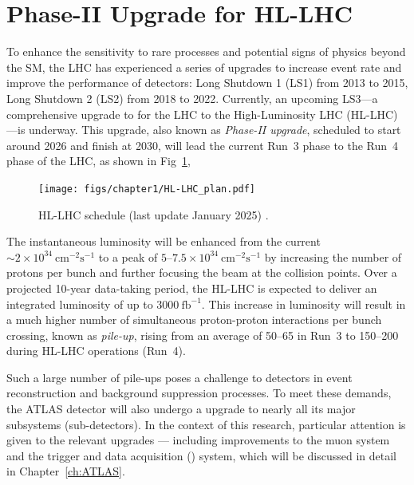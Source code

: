 \section{Phase-II Upgrade for HL-LHC} \label{sec:upgrade}
To enhance the sensitivity to rare processes and potential signs of physics beyond the SM, the LHC has experienced a series of upgrades to increase event rate and improve the performance of detectors: Long Shutdown 1 (LS1) from 2013 to 2015, Long Shutdown 2 (LS2) from 2018 to 2022. Currently, an upcoming LS3---a comprehensive upgrade to for the LHC to the High-Luminosity LHC (HL-LHC)---is underway. This upgrade, also known as \textit{Phase-II upgrade}, scheduled to start around 2026 and finish at 2030, will lead the current Run~3 phase to the Run~4 phase of the LHC, as shown in Fig~\ref{fig:HL-LHC},

\begin{figure}[htbp]
  \centering
  \texttt{[image: figs/chapter1/HL-LHC\_plan.pdf]}
  \caption{HL-LHC schedule (last update January 2025) \cite{HL-LHC}.}
  \label{fig:HL-LHC}
\end{figure}

The instantaneous luminosity will be enhanced from the current $\sim 2 \times 10^{34}~\mathrm{cm}^{-2}\mathrm{s}^{-1}$ to a peak of $5$–$7.5 \times 10^{34}~\mathrm{cm}^{-2}\mathrm{s}^{-1}$ by increasing the number of protons per bunch and further focusing the beam at the collision points. Over a projected 10-year data-taking period, the HL-LHC is expected to deliver an integrated luminosity of up to $3000~\mathrm{fb}^{-1}$. This increase in luminosity will result in a much higher number of simultaneous proton-proton interactions per bunch crossing, known as \textit{pile-up}, rising from an average of 50–65 in Run~3 to 150–200 during HL-LHC operations (Run~4).

Such a large number of pile-ups poses a challenge to detectors in event reconstruction and background suppression processes. To meet these demands, the ATLAS detector will also undergo a upgrade to nearly all its major subsystems (sub-detectors). In the context of this research, particular attention is given to the relevant upgrades — including improvements to the muon system and the trigger and data acquisition (\TDAQ) system, which will be discussed in detail in Chapter~\ref{ch:ATLAS}.

